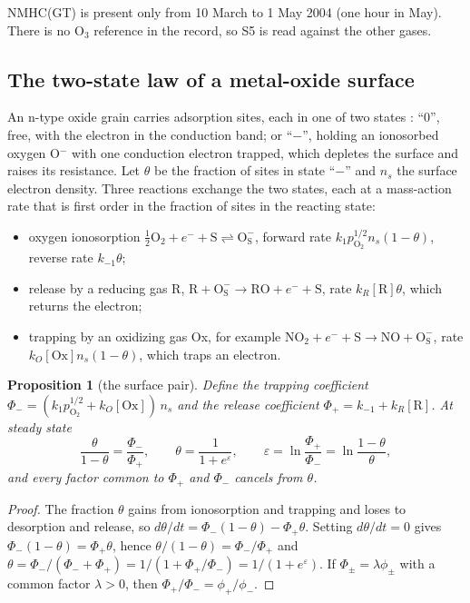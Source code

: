 \documentclass[11pt]{article}
\newtheorem{proposition}[theorem]{Proposition}
\theoremstyle{definition}\newtheorem{definition}[theorem]{Definition}
\theoremstyle{remark}\newtheorem{remark}[theorem]{Remark}
\begin{document}
NMHC(GT) is present only from 10 March to 1 May 2004 (one hour in May). There is no O$_3$ reference in the record, so S5 is read against the other gases.

\subsection{The two-state law of a metal-oxide surface}\label{sec:mos}
An n-type oxide grain carries adsorption sites, each in one of two states \cite{BarsanWeimar2001,MadouMorrison}: ``0'', free, with the electron in the conduction band; or ``$-$'', holding an ionosorbed oxygen O$^-$ with one conduction electron trapped, which depletes the surface and raises its resistance. Let $\theta$ be the fraction of sites in state ``$-$'' and $n_s$ the surface electron density. Three reactions exchange the two states, each at a mass-action rate that is first order in the fraction of sites in the reacting state:
\begin{itemize}
\item oxygen ionosorption $\tfrac12\mathrm{O_2}+e^-+\mathrm S\rightleftharpoons\mathrm{O^-_S}$, forward rate $k_1p_{\mathrm{O_2}}^{1/2}n_s(1-\theta)$, reverse rate $k_{-1}\theta$;
\item release by a reducing gas R, $\mathrm R+\mathrm{O^-_S}\to\mathrm{RO}+e^-+\mathrm S$, rate $k_R[\mathrm R]\theta$, which returns the electron;
\item trapping by an oxidizing gas Ox, for example $\mathrm{NO_2}+e^-+\mathrm S\to\mathrm{NO}+\mathrm{O^-_S}$, rate $k_O[\mathrm{Ox}]n_s(1-\theta)$, which traps an electron.
\end{itemize}

\begin{proposition}[the surface pair]\label{prop:mos}
Define the trapping coefficient $\Phi_-=(k_1p_{\mathrm{O_2}}^{1/2}+k_O[\mathrm{Ox}])\,n_s$ and the release coefficient $\Phi_+=k_{-1}+k_R[\mathrm R]$. At steady state
\[
\frac{\theta}{1-\theta}=\frac{\Phi_-}{\Phi_+},\qquad \theta=\frac1{1+e^{\varepsilon}},\qquad \varepsilon=\ln\frac{\Phi_+}{\Phi_-}=\ln\frac{1-\theta}{\theta},
\]
and every factor common to $\Phi_+$ and $\Phi_-$ cancels from $\theta$.
\end{proposition}
\begin{proof}
The fraction $\theta$ gains from ionosorption and trapping and loses to desorption and release, so $d\theta/dt=\Phi_-(1-\theta)-\Phi_+\theta$. Setting $d\theta/dt=0$ gives $\Phi_-(1-\theta)=\Phi_+\theta$, hence $\theta/(1-\theta)=\Phi_-/\Phi_+$ and $\theta=\Phi_-/(\Phi_-+\Phi_+)=1/(1+\Phi_+/\Phi_-)=1/(1+e^{\varepsilon})$. If $\Phi_\pm=\lambda\phi_\pm$ with a common factor $\lambda>0$, then $\Phi_+/\Phi_-=\phi_+/\phi_-$.
\end{proof}
\end{document}
